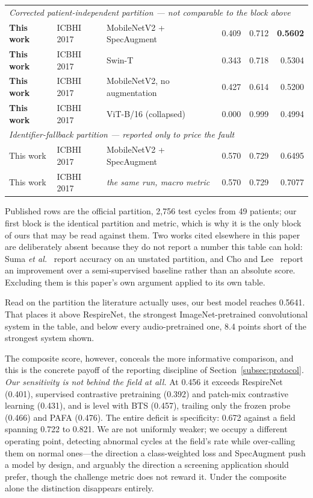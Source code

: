\documentclass[journal,onecolumn]{IEEEtran}
\newcommand{\best}[1]{\textbf{#1}}
\begin{document}
\begin{table}[!t]
\begin{tabular}{lllrrr}
\midrule
\multicolumn{6}{l}{\emph{Corrected patient-independent partition --- not comparable to the block above}}\\
\best{This work} & ICBHI 2017 & MobileNetV2 + SpecAugment & 0.409 & 0.712 & \best{0.5602} \\
\best{This work} & ICBHI 2017 & Swin-T & 0.343 & 0.718 & 0.5304 \\
\best{This work} & ICBHI 2017 & MobileNetV2, no augmentation & 0.427 & 0.614 & 0.5200 \\
\best{This work} & ICBHI 2017 & ViT-B/16 (collapsed) & 0.000 & 0.999 & 0.4994 \\
\midrule
\multicolumn{6}{l}{\emph{Identifier-fallback partition --- reported only to price the fault}}\\
This work & ICBHI 2017 & MobileNetV2 + SpecAugment & 0.570 & 0.729 & 0.6495 \\
This work & ICBHI 2017 & \emph{the same run, macro metric} & 0.570 & 0.729 & 0.7077 \\
\bottomrule
\end{tabular}

\vspace{2pt}
\footnotesize Published rows are the official partition, 2{,}756 test cycles from
49 patients; our first block is the identical partition and metric, which is why it
is the only block of ours that may be read against them. Two works cited elsewhere
in this paper are deliberately absent because they do not report a number this
table can hold: Suma \emph{et al.}~\cite{suma2025mtl} report accuracy on an
unstated partition, and Cho and Lee~\cite{cho2025openset} report an improvement
over a semi-supervised baseline rather than an absolute score. Excluding them is
this paper's own argument applied to its own table.
\end{table}

Read on the partition the literature actually uses, our best model reaches 0.5641.
That places it above RespireNet, the strongest ImageNet-pretrained convolutional
system in the table, and below every audio-pretrained one, 8.4 points short of the
strongest system shown.

The composite score, however, conceals the more informative comparison, and this
is the concrete payoff of the reporting discipline of
Section~\ref{subsec:protocol}. \emph{Our sensitivity is not behind the field at
all.} At 0.456 it exceeds RespireNet (0.401), supervised contrastive pretraining
(0.392) and patch-mix contrastive learning (0.431), and is level with BTS (0.457),
trailing only the frozen probe (0.466) and PAFA (0.476). The entire deficit is
specificity: 0.672 against a field spanning 0.722 to 0.821. We are not uniformly
weaker; we occupy a different operating point, detecting abnormal cycles at the
field's rate while over-calling them on normal ones---the direction a
class-weighted loss and SpecAugment push a model by design, and arguably the
direction a screening application should prefer, though the challenge metric does
not reward it. Under the composite alone the distinction disappears entirely.
\end{document}
